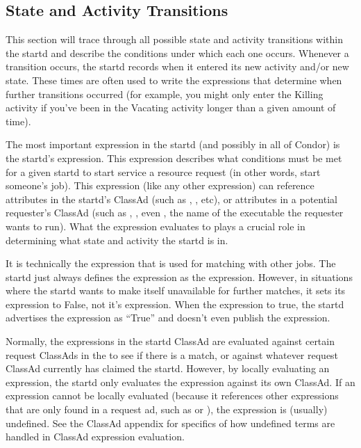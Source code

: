 \subsection{ State and Activity Transitions}
\label{sec:State-and-Activity-Transitions}

This section will trace through all possible state and activity
transitions within the startd and describe the conditions under which
each one occurs.  Whenever a transition occurs, the startd records
when it entered its new activity and/or new state.  These times are
often used to write the expressions that determine when further
transitions occurred (for example, you might only enter the Killing
activity if you've been in the Vacating activity longer than a given
amount of time).

The most important expression in the startd (and possibly in all of
Condor) is the startd's  expression.  This expression
describes what conditions must be met for a given startd to start
service a resource request (in other words, start someone's job).
This expression (like any other expression) can reference attributes
in the startd's ClassAd (such as , ,
etc), or attributes in a potential requester's ClassAd (such as
, , even , the name of the
executable the requester wants to run).  What the 
expression evaluates to plays a crucial role in determining what state
and activity the startd is in.

It is technically the  expression that is used for
matching with other jobs.  The startd just always defines the
 expression as the  expression.
However, in situations where the startd wants to make itself
unavailable for further matches, it sets its 
expression to False, not it's  expression.  When the
 expression  to true, the startd
advertises the  expression as ``True'' and doesn't
even publish the  expression.

Normally, the expressions in the startd ClassAd are evaluated against
certain request ClassAds in the  to see if there is
a match, or against whatever request ClassAd currently has claimed the
startd.  However, by locally evaluating an expression, the startd only
evaluates the expression against its own ClassAd.  If an expression
cannot be locally evaluated (because it references other expressions
that are only found in a request ad, such as  or
), the expression is (usually) undefined.  See the
ClassAd appendix for specifics of how undefined terms are handled in
ClassAd expression evaluation.


